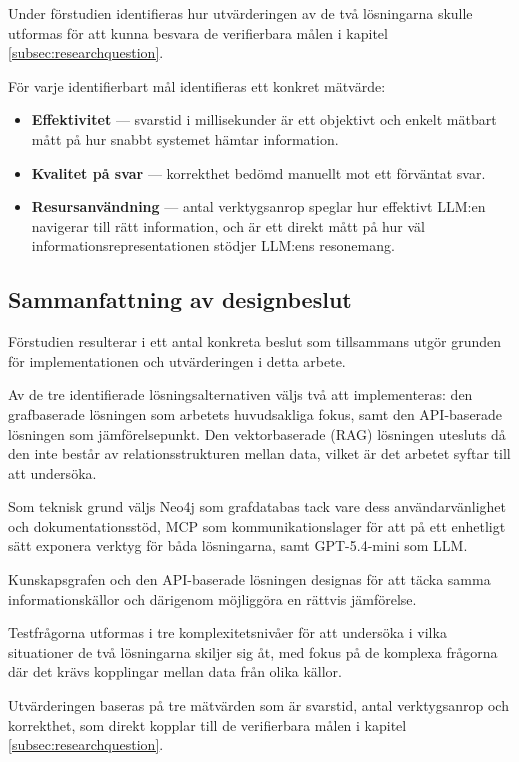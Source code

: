Under förstudien identifieras hur utvärderingen av de två lösningarna skulle
  utformas för att kunna besvara de verifierbara målen i kapitel
  \ref{subsec:researchquestion}.

För varje identifierbart mål identifieras ett konkret mätvärde:

  \begin{itemize}
    \item \textbf{Effektivitet} — svarstid i millisekunder är ett objektivt och
    enkelt mätbart mått på hur snabbt systemet hämtar information.

    \item \textbf{Kvalitet på svar} — korrekthet bedömd manuellt mot ett
    förväntat svar.

    \item \textbf{Resursanvändning} — antal verktygsanrop speglar hur effektivt
    LLM:en navigerar till rätt information, och är ett direkt mått på hur
    väl informationsrepresentationen stödjer LLM:ens resonemang.

  \end{itemize}

\subsection{Sammanfattning av designbeslut}

Förstudien resulterar i ett antal konkreta beslut som tillsammans utgör
grunden för implementationen och utvärderingen i detta arbete.

Av de tre identifierade lösningsalternativen väljs två att implementeras:
den grafbaserade lösningen som arbetets huvudsakliga fokus, samt
den API-baserade lösningen som jämförelsepunkt. Den vektorbaserade
(RAG) lösningen utesluts då den inte består av relationsstrukturen mellan
data, vilket är det arbetet syftar till att undersöka.

Som teknisk grund väljs Neo4j som grafdatabas tack vare dess användarvänlighet och dokumentationsstöd, MCP som kommunikationslager för att på ett enhetligt
sätt exponera verktyg för båda lösningarna, samt GPT-5.4-mini som LLM.

Kunskapsgrafen och den API-baserade lösningen designas för att täcka
samma informationskällor och därigenom möjliggöra en rättvis jämförelse.

Testfrågorna utformas i tre komplexitetsnivåer för att undersöka i vilka situationer de två lösningarna
skiljer sig åt, med fokus på de komplexa frågorna där det krävs kopplingar mellan data från olika källor.

Utvärderingen baseras på tre mätvärden som är svarstid, antal verktygsanrop
och korrekthet, som direkt kopplar till de verifierbara målen i kapitel
\ref{subsec:researchquestion}.


